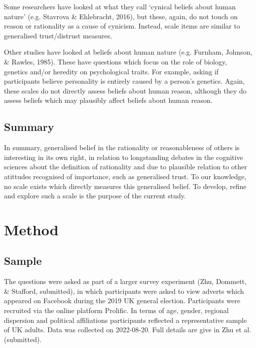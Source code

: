 \documentclass[
  ,jou,floatsintext]{apa6}
\begin{document}
Some researchers have looked at what they call `cynical beliefs about human nature' (e.g. Stavrova \& Ehlebracht, 2016), but these, again, do not touch on reason or rationality as a cause of cynicism. Instead, scale items are similar to generalised trust/distrust measures.

Other studies have looked at beliefs about human nature (e.g. Furnham, Johnson, \& Rawles, 1985). These have questions which focus on the role of biology, genetics and/or heredity on psychological traits. For example, asking if participants believe personality is entirely caused by a person's genetics. Again, these scales do not directly assess beliefs about human reason, although they do assess beliefs which may plausibly affect beliefs about human reason.

\hypertarget{summary}{%
\subsection{Summary}\label{summary}}

In summary, generalised belief in the rationality or reasonableness of others is interesting in its own right, in relation to longstanding debates in the cognitive sciences about the definition of rationality and due to plausible relation to other atittudes recognised of importance, such as generalised trust. To our knowledge, no scale exists which directly measures this generalised belief. To develop, refine and explore such a scale is the purpose of the current study.

\hypertarget{method}{%
\section{Method}\label{method}}

\hypertarget{sample}{%
\subsection{Sample}\label{sample}}

The questions were asked as part of a larger survey experiment (Zhu, Dommett, \& Stafford, submitted), in which participants were asked to view adverts which appeared on Facebook during the 2019 UK general election. Participants were recruited via the online platform Prolific. In terms of age, gender, regional dispersion and political affiliations participants reflected a representative sample of UK adults. Data was collected on 2022-08-20. Full details are give in Zhu et al. (submitted).
\end{document}
